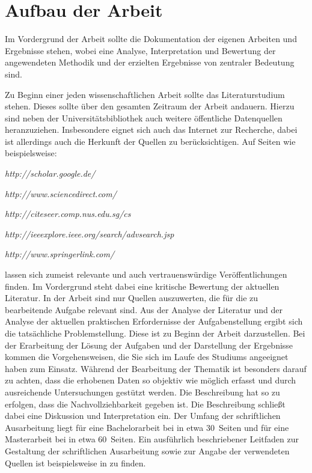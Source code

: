 \chapter{Aufbau der Arbeit}
\label{aufbau}

Im Vordergrund der Arbeit sollte die Dokumentation der eigenen
Arbeiten und Ergebnisse stehen, wobei eine Analyse, Interpretation
und Bewertung der angewendeten Methodik und der erzielten
Ergebnisse von zentraler Bedeutung sind.

Zu Beginn einer jeden wissenschaftlichen Arbeit sollte das
Literaturstudium stehen. Dieses sollte über den gesamten Zeitraum
der Arbeit andauern. Hierzu sind neben der Universitätsbibliothek
auch weitere öffentliche Datenquellen heranzuziehen. Insbesondere
eignet sich auch das Internet zur Recherche, dabei ist allerdings
auch die Herkunft der Quellen zu berücksichtigen. Auf Seiten wie
beispielsweise:

\emph{http://scholar.google.de/}

\emph{http://www.sciencedirect.com/}

\emph{http://citeseer.comp.nus.edu.sg/cs}

\emph{http://ieeexplore.ieee.org/search/advsearch.jsp}

\emph{http://www.springerlink.com/}

lassen sich zumeist relevante und auch vertrauenswürdige
Veröffentlichungen finden. Im Vordergrund steht dabei eine
kritische Bewertung der aktuellen Literatur. In der Arbeit sind
nur Quellen auszuwerten, die für die zu bearbeitende Aufgabe
relevant sind. Aus der Analyse der Literatur und der Analyse der
aktuellen praktischen Erfordernisse der Aufgabenstellung ergibt
sich die tatsächliche Problemstellung. Diese ist zu Beginn der
Arbeit darzustellen. Bei der Erarbeitung der Lösung der Aufgaben
und der Darstellung der Ergebnisse kommen die Vorgehensweisen, die
Sie sich im Laufe des Studiums angeeignet haben zum Einsatz.
Während der Bearbeitung der Thematik ist besonders darauf zu
achten, dass die erhobenen Daten so objektiv wie möglich erfasst
und durch ausreichende Untersuchungen gestützt werden. Die
Beschreibung hat so zu erfolgen, dass die Nachvollziehbarkeit
gegeben ist. Die Beschreibung schließt dabei eine Diskussion und
Interpretation ein. Der Umfang der schriftlichen Ausarbeitung
liegt für eine Bachelorarbeit bei in etwa 30~Seiten und für eine
Masterarbeit bei in etwa 60~Seiten. Ein ausführlich
beschriebener Leitfaden zur Gestaltung der schriftlichen
Ausarbeitung sowie zur Angabe der verwendeten Quellen ist
beispielsweise in \textcite{Leit1} zu finden.

